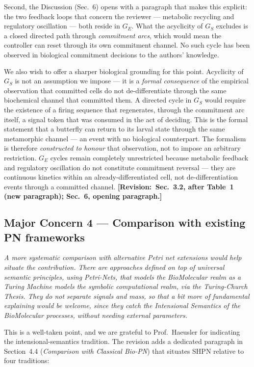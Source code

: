 \documentclass[11pt,letterpaper]{article}
\newcommand{\rquote}[1]{\begin{mdframed}[style=reviewquote]\textit{#1}\end{mdframed}}
\newcommand{\sref}[1]{\textbf{[Revision:~#1]}}
\begin{document}
Second, the Discussion (Sec.~6) opens with a paragraph that makes this
explicit: the two feedback loops that concern the reviewer --- metabolic
recycling and regulatory oscillation --- both reside in $G_E$. What the
acyclicity of $G_S$ excludes is a closed directed path through \emph{commitment
arcs}, which would mean the controller can reset through its own commitment
channel. No such cycle has been observed in biological commitment decisions to
the authors' knowledge.

We also wish to offer a sharper biological grounding for this point. Acyclicity
of $G_S$ is not an assumption we impose --- it is a \emph{formal consequence}
of the empirical observation that committed cells do not de-differentiate
through the same biochemical channel that committed them. A directed cycle in
$G_S$ would require the existence of a firing sequence that regenerates, through
the commitment arc itself, a signal token that was consumed in the act of
deciding. This is the formal statement that a butterfly can return to its larval
state through the same metamorphic channel --- an event with no biological
counterpart. The formalism is therefore \emph{constructed to honour} that
observation, not to impose an arbitrary restriction. $G_E$ cycles remain
completely unrestricted because metabolic feedback and regulatory oscillation do
not constitute commitment reversal --- they are continuous kinetics within an
already-differentiated cell, not de-differentiation events through a committed
channel.
\sref{Sec.~3.2, after Table~1 (new paragraph); Sec.~6, opening paragraph.}

\subsection*{Major Concern 4 --- Comparison with existing PN frameworks}

\rquote{A more systematic comparison with alternative Petri net extensions
would help situate the contribution. There are approaches defined on top of
universal semantic principles, using Petri-Nets, that models the BioMolecular
realm as a Turing Machine models the symbolic computational realm, via the
Turing-Church Thesis. They do not separate signals and mass, so that a bit more
of fundamental explaining would be welcome, since they catch the Intensional
Semantics of the BioMolecular processes, without needing external parameters.}

This is a well-taken point, and we are grateful to Prof.\ Haeusler for
indicating the intensional-semantics tradition. The revision adds a dedicated
paragraph in Section~4.4 (\textit{Comparison with Classical Bio-PN}) that
situates SHPN relative to four traditions:
\end{document}
